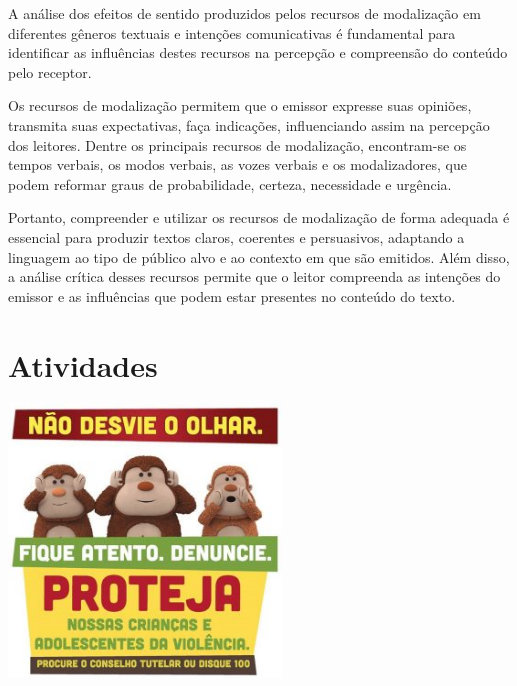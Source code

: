 {{A análise dos efeitos de sentido produzidos pelos recursos de
modalização em diferentes gêneros textuais e intenções comunicativas é
fundamental para identificar as influências destes recursos na percepção
e compreensão do conteúdo pelo receptor.

Os recursos de modalização permitem que o emissor expresse suas
opiniões, transmita suas expectativas, faça indicações, influenciando
assim na percepção dos leitores. Dentre os principais recursos
de modalização, encontram-se os tempos verbais, os modos verbais, as
vozes verbais e os modalizadores, que podem reformar graus de
probabilidade, certeza, necessidade e urgência.

Portanto, compreender e utilizar os recursos de modalização de forma
adequada é essencial para produzir textos claros, coerentes e
persuasivos, adaptando a linguagem ao tipo de público alvo e ao contexto
em que são emitidos. Além disso, a análise crítica desses recursos
permite que o leitor compreenda as intenções do emissor e as influências
que podem estar presentes no conteúdo do texto.}


\section{Atividades}

\includegraphics[width=2.85536in,height=2.85536in]{./imgSAEB_7_POR/media/image9.png}

}
